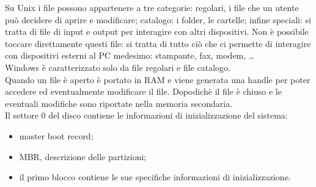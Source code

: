 \documentclass{article}
\begin{document}
Su Unix i file possono appartenere a tre categorie: regolari, i file che un utente può decidere di aprire e modificare; catalogo: i folder, le cartelle; infine speciali: si tratta di file di input e output per interagire con altri dispositivi. Non è possibile toccare direttamente questi file: si tratta di tutto ciò che ci permette di interagire con dispositivi esterni al PC medesimo: stampante, fax, modem, \dots\\
Windows è caratterizzato solo da file regolari e file catalogo.\\
Quando un file è aperto è portato in RAM e viene generata una handle per poter accedere ed eventualmente modificare il file. Dopodichè il file è chiuso e le eventuali modifiche sono riportate nella memoria secondaria.\\

Il settore 0 del disco contiene le informazioni di inizializzazione del sistema:
\begin{itemize}
	\item master boot record;
	\item MBR, descrizione delle partizioni;
	\item il primo blocco contiene le sue specifiche informazioni di inizializzazione. 
\end{itemize}
\end{document}
